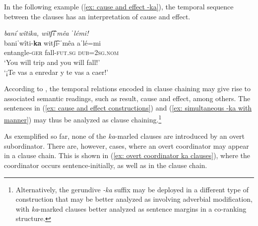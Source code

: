     \z
\z

In the following example (\ref{ex: cause and effect -ka}), the temporal sequence between the clauses has an interpretation of cause and effect.

\ea\label{ex: cause and effect -ka}

    \textit{baniˈwîtika, witʃ͡iˈmêa ˈlémi!}\\
    \gll    baniˈwîti-\textbf{ka} witʃ͡i-ˈmêa aˈlé=mi\\
            entangle-\textsc{{ger}} fall-\textsc{fut.sg} \textsc{dub=2sg.nom}\\
    \glt    `You will trip and you will fall!'\\
    \glt    `¡Te vas a enredar y te vas a caer!'  \\

\z

According to \citet[400]{longacre2007sentences}, the temporal relations encoded in clause chaining may give rise to associated semantic readings, such as result, cause and effect, among others. The sentences in (\ref{ex: cause and effect constructions}) and (\ref{ex: simultaneous -ka with manner}) may thus be analyzed as clause chaining.\footnote{Alternatively, the gerundive \textit{-ka} suffix may be deployed in a different type of construction that may be better analyzed as involving adverbial modification, with \textit{ka}-marked clauses better analyzed as sentence margins in a co-ranking structure.}

As exemplified so far, none of the \textit{ka}-marled clauses are introduced by an overt subordinator. There are, however, cases, where an overt coordinator may appear in a clause chain. This is shown in (\ref{ex: overt coordinator ka clauses}), where the coordinator occurs sentence-initially, as well as in the clause chain.

